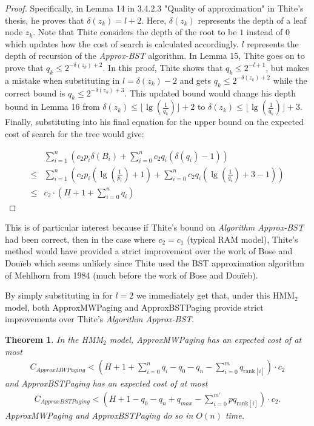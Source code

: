 \documentclass[letterpaper,12pt,titlepage,oneside,final]{book}
\theoremstyle{plain}
\newtheorem{thm}{Theorem}[section]
\begin{document}
\begin{proof}
Specifically, in Lemma 14 in 3.4.2.3 "Quality of approximation" in Thite's thesis, he proves that $\delta(z_k) = l+2$. Here, $\delta(z_k)$ represents the depth of a leaf node $z_k$. Note that Thite considers the depth of the root to be $1$ instead of $0$ which updates how the cost of search is calculated accordingly. $l$ represents the depth of recursion of the \textit{Approx-BST} algorithm. In Lemma 15, Thite goes on to prove that $q_k \leq 2^{-\delta(z_k)+2}$. In this proof, Thite shows that $q_k \leq 2^{-l+1}$, but makes a mistake when substituting in $l=\delta(z_k)-2$ and gets $q_k \leq 2^{-\delta(z_k)+2}$ while the correct bound is $q_k \leq 2^{-\delta(z_k)+3}$. This updated bound would change his depth bound in Lemma 16 from $\delta(z_k) \leq \lfloor \lg(\frac{1}{q_k}) \rfloor + 2$ to $\delta(z_k) \leq \lfloor \lg(\frac{1}{q_k}) \rfloor + 3$. Finally, substituting into his final equation for the upper bound on the expected cost of search for the tree would give:

\begin{align*}
&\sum_{i=1}^{n} \left(c_2 p_i \delta(B_i )+ \sum_{i=0}^{n} c_2 q_i (\delta(q_i)-1) \right)\\
\leq &\sum_{i=1}^{n} \left(c_2 p_i (\lg(\frac{1}{p_i})+1)+ \sum_{i=0}^{n} c_2 q_i (\lg(\frac{1}{q_i})+3-1) \right) \\
\leq &c_2 \cdot \left(H+1+\sum_{i=0}^{n}q_i \right)
\end{align*}
\end{proof}

This is of particular interest because if Thite's bound on \textit{Algorithm Approx-BST} had been correct, then in the case where $c_2=c_1$ (typical RAM model), Thite's method would have provided a strict improvement over the work of Bose and Dou\"{i}eb \cite{bose2009efficient} which seems unlikely since Thite used the BST approximation algorithm of Mehlhorn from 1984 \cite{mehlhorn1984sorting} (much before the work of Bose and Dou\"{i}eb).

By simply substituting in for $l=2$ we immediately get that, under this HMM$_2$ model, both ApproxMWPaging and ApproxBSTPaging provide strict improvements over Thite's \textit{Algorithm Approx-BST}. 

\begin{thm}
In the HMM$_2$ model, ApproxMWPaging has an expected cost of at most \\
\begin{align*}
C_{ApproxMWPaging} < (H + 1 + \sum_{i=0}^n q_i - q_0 - q_n - \sum_{i=0}^m q_{\text{rank}[i]}) \cdot  c_2
\end{align*}
and ApproxBSTPaging has an expected cost of at most
\begin{align*}
C_{ApproxBSTPaging} <  (H + 1 - q_0 - q_n + q_{max} - \sum_{i=0}^{m'} pq_{\text{rank}[i]})\cdot c_2.
\end{align*}
ApproxMWPaging and ApproxBSTPaging do so in $O(n)$ time.
\end{thm}
\end{document}
